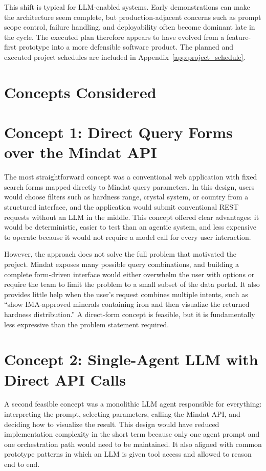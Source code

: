 \documentclass[12pt,oneside]{report}
\begin{document}
This shift is typical for LLM-enabled systems. Early demonstrations can make the architecture seem complete, but production-adjacent concerns such as prompt scope control, failure handling, and deployability often become dominant late in the cycle. The executed plan therefore appears to have evolved from a feature-first prototype into a more defensible software product. The planned and executed project schedules are included in Appendix~\ref{app:project_schedule}.

\section{Concepts Considered}

\section{Concept 1: Direct Query Forms over the Mindat API}

The most straightforward concept was a conventional web application with fixed search forms mapped directly to Mindat query parameters. In this design, users would choose filters such as hardness range, crystal system, or country from a structured interface, and the application would submit conventional REST requests without an LLM in the middle. This concept offered clear advantages: it would be deterministic, easier to test than an agentic system, and less expensive to operate because it would not require a model call for every user interaction.

However, the approach does not solve the full problem that motivated the project. Mindat exposes many possible query combinations, and building a complete form-driven interface would either overwhelm the user with options or require the team to limit the problem to a small subset of the data portal. It also provides little help when the user's request combines multiple intents, such as ``show IMA-approved minerals containing iron and then visualize the returned hardness distribution.'' A direct-form concept is feasible, but it is fundamentally less expressive than the problem statement required.

\section{Concept 2: Single-Agent LLM with Direct API Calls}

A second feasible concept was a monolithic LLM agent responsible for everything: interpreting the prompt, selecting parameters, calling the Mindat API, and deciding how to visualize the result. This design would have reduced implementation complexity in the short term because only one agent prompt and one orchestration path would need to be maintained. It also aligned with common prototype patterns in which an LLM is given tool access and allowed to reason end to end.
\end{document}
